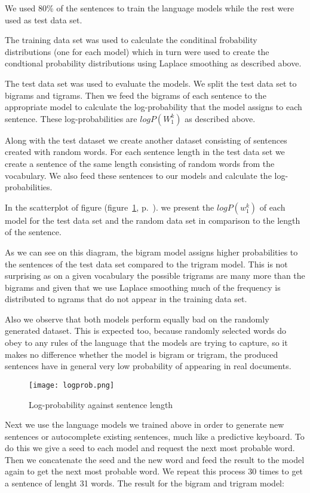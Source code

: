 \documentclass[a4paper]{article}
\begin{document}
We used 80\% of the sentences to train the language models while the rest were
used as test data set. 

The training data set was used to calculate the
conditinal frobability distributions (one for each model) which in turn were
used to create the condtional probability distributions using Laplace smoothing
as described above.

The test data set was used to evaluate the models. We split the test data set to
bigrams and tigrams. Then we feed the bigrams of each sentence to the
appropriate model to calculate the log-probability that the model assigns to
each sentence. These log-probabilities are $logP(W_1^k)$ as described above.

Along with the test dataset we create another dataset consisting of sentences
created with random words. For each sentence length in the test data set we
create a sentence of the same length consisting of random words from the
vocabulary. We also feed these sentences to our models and calculate the
log-probabilities.

In the scatterplot of figure (figure~\ref{fig:logprob},
p.~\pageref{fig:logprob}). we present the $logP(w_1^k)$ of each model for the
test data set and the random data set in comparison to the length of the
sentence.

As we can see on this diagram, the bigram model assigns higher probabilities to
the sentences of the test data set compared to the trigram model. This is not
surprising as on a given vocabulary the possible trigrams are many more than the
bigrams and given that we use Laplace smoothing much of the frequency is
distributed to ngrams that do not appear in the training data set.

Also we observe that both models perform equally bad on the randomly generated
dataset. This is expected too, because randomly selected words do obey to any
rules of the language that the models are trying to capture, so it makes no
difference whether the model is bigram or trigram, the produced sentences have
in general very low probability of appearing in real documents.

  \begin{figure}[H]
  \centering
  \texttt{[image: logprob.png]}
  \caption{Log-probability against sentence length}
  \label{fig:logprob}
  \end{figure}
  
Next we use the language models we trained above in order to generate new
sentences or autocomplete existing sentences, much like a predictive keyboard.
To do this we give a seed to each model and request the next most probable word.
Then we concatenate the seed and the new word and feed the result to the model
again to get the next most probable word. We repeat this process 30 times to get
a sentence of lenght 31 words. The result for the bigram and trigram model:
\end{document}
